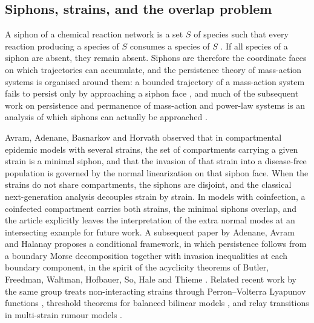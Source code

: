 \documentclass[11pt,a4paper]{article}
\theoremstyle{plain}
\theoremstyle{definition}
\theoremstyle{remark}
\begin{document}
\subsection{Siphons, strains, and the overlap problem}

A siphon of a chemical reaction network is a set $S$ of species such that every reaction producing a species of $S$ consumes a species of $S$ \citep{AngeliDeLeenheerSontag2007,ShiuSturmfels2010,Feinberg2019}. If all species of a siphon are absent, they remain absent. Siphons are therefore the coordinate faces on which trajectories can accumulate, and the persistence theory of mass-action systems is organised around them: a bounded trajectory of a mass-action system fails to persist only by approaching a siphon face \citep{AngeliDeLeenheerSontag2007}, and much of the subsequent work on persistence and permanence of mass-action and power-law systems is an analysis of which siphons can actually be approached \citep{CraciunNazarovPantea2013}.

Avram, Adenane, Basnarkov and Horvath \citep{AvramAdenaneBasnarkovHorvath2025} observed that in compartmental epidemic models with several strains, the set of compartments carrying a given strain is a minimal siphon, and that the invasion of that strain into a disease-free population is governed by the normal linearization on that siphon face. When the strains do not share compartments, the siphons are disjoint, and the classical next-generation analysis \citep{DiekmannHeesterbeekMetz1990,vandenDriesscheWatmough2002} decouples strain by strain. In models with coinfection, a coinfected compartment carries both strains, the minimal siphons overlap, and the article \citep{AvramAdenaneBasnarkovHorvath2025} explicitly leaves the interpretation of the extra normal modes at an intersecting example for future work. A subsequent paper by Adenane, Avram and Halanay \citep{AdenaneAvramHalanay2026} proposes a conditional framework, in which persistence follows from a boundary Morse decomposition together with invasion inequalities at each boundary component, in the spirit of the acyclicity theorems of Butler, Freedman, Waltman, Hofbauer, So, Hale and Thieme \citep{ButlerFreedmanWaltman1986,ButlerWaltman1986,HofbauerSo1989,HaleWaltman1989,Garay1989,Thieme1993,FreedmanRuanTang1994,SmithThieme2011}. Related recent work by the same group treats non-interacting strains through Perron--Volterra Lyapunov functions \citep{AdenaneAvramBeldimanHalanay2026}, threshold theorems for balanced bilinear models \citep{AvramEtAl2026PerronFrobenius}, and relay transitions in multi-strain rumour models \citep{AvramAdenaneHalanay2026relay}.
\end{document}
